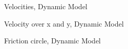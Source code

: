 \begin{figure}[ht]
	\centering
  	
	\caption{Velocities, Dynamic Model}
	\label{fig:SimDyn_v}
\end{figure}

\begin{figure}[ht]
	\centering
  	
	\caption{Velocity over x and y, Dynamic Model}
	\label{fig:SimDyn_v_over_xy}
\end{figure}

\begin{figure}[ht]
	\centering
  	
	\caption{Friction circle, Dynamic Model}
	\label{fig:SimDyn_fcircle}
\end{figure}